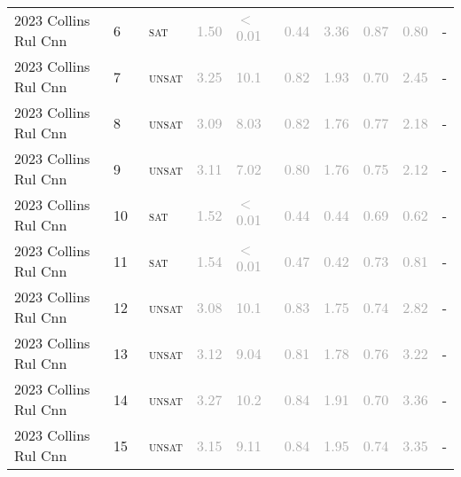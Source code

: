 \begin{center}
{\begin{longtable}{@{}llllllllll@{}}
2023 Collins Rul Cnn & 6 & ~\textsc{sat} & \textcolor{darkgray}{1.50} & \textcolor{darkgray}{$<$0.01} & \textcolor{darkgray}{0.44} & \textcolor{darkgray}{3.36} & \textcolor{darkgray}{0.87} & \textcolor{darkgray}{0.80} & - \\
2023 Collins Rul Cnn & 7 & ~\textsc{unsat} & \textcolor{darkgray}{3.25} & \textcolor{darkgray}{10.1} & \textcolor{darkgray}{0.82} & \textcolor{darkgray}{1.93} & \textcolor{darkgray}{0.70} & \textcolor{darkgray}{2.45} & - \\
2023 Collins Rul Cnn & 8 & ~\textsc{unsat} & \textcolor{darkgray}{3.09} & \textcolor{darkgray}{8.03} & \textcolor{darkgray}{0.82} & \textcolor{darkgray}{1.76} & \textcolor{darkgray}{0.77} & \textcolor{darkgray}{2.18} & - \\
2023 Collins Rul Cnn & 9 & ~\textsc{unsat} & \textcolor{darkgray}{3.11} & \textcolor{darkgray}{7.02} & \textcolor{darkgray}{0.80} & \textcolor{darkgray}{1.76} & \textcolor{darkgray}{0.75} & \textcolor{darkgray}{2.12} & - \\
2023 Collins Rul Cnn & 10 & ~\textsc{sat} & \textcolor{darkgray}{1.52} & \textcolor{darkgray}{$<$0.01} & \textcolor{darkgray}{0.44} & \textcolor{darkgray}{0.44} & \textcolor{darkgray}{0.69} & \textcolor{darkgray}{0.62} & - \\
2023 Collins Rul Cnn & 11 & ~\textsc{sat} & \textcolor{darkgray}{1.54} & \textcolor{darkgray}{$<$0.01} & \textcolor{darkgray}{0.47} & \textcolor{darkgray}{0.42} & \textcolor{darkgray}{0.73} & \textcolor{darkgray}{0.81} & - \\
2023 Collins Rul Cnn & 12 & ~\textsc{unsat} & \textcolor{darkgray}{3.08} & \textcolor{darkgray}{10.1} & \textcolor{darkgray}{0.83} & \textcolor{darkgray}{1.75} & \textcolor{darkgray}{0.74} & \textcolor{darkgray}{2.82} & - \\
2023 Collins Rul Cnn & 13 & ~\textsc{unsat} & \textcolor{darkgray}{3.12} & \textcolor{darkgray}{9.04} & \textcolor{darkgray}{0.81} & \textcolor{darkgray}{1.78} & \textcolor{darkgray}{0.76} & \textcolor{darkgray}{3.22} & - \\
2023 Collins Rul Cnn & 14 & ~\textsc{unsat} & \textcolor{darkgray}{3.27} & \textcolor{darkgray}{10.2} & \textcolor{darkgray}{0.84} & \textcolor{darkgray}{1.91} & \textcolor{darkgray}{0.70} & \textcolor{darkgray}{3.36} & - \\
2023 Collins Rul Cnn & 15 & ~\textsc{unsat} & \textcolor{darkgray}{3.15} & \textcolor{darkgray}{9.11} & \textcolor{darkgray}{0.84} & \textcolor{darkgray}{1.95} & \textcolor{darkgray}{0.74} & \textcolor{darkgray}{3.35} & - \\

\end{longtable}}
\end{center}
